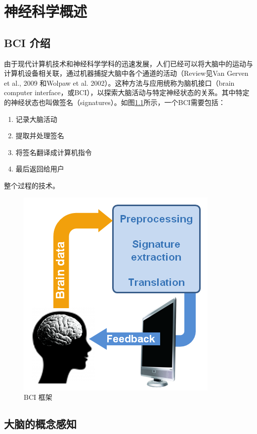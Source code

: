 \chapter{神经科学概述}

\section{BCI 介绍}

由于现代计算机技术和神经科学学科的迅速发展，人们已经可以将大脑中的运动与计算机设备相关联，通过机器捕捉大脑中各个通道的活动（Review见Van Gerven et al., 2009 和Wolpaw et al. 2002）。这种方法与应用统称为脑机接口（brain computer interface，或BCI），以探索大脑活动与特定神经状态的关系。其中特定的神经状态也叫做签名（signatures）。如图\ref{Fig:bci_brief}所示，一个BCI需要包括：
\begin{enumerate}
\item{记录大脑活动}
\item{提取并处理签名}
\item{将签名翻译成计算机指令}
\item{最后返回给用户}
\end{enumerate}

整个过程的技术。

\begin{figure}[htb]
\centering
\includegraphics[scale=0.8]{Pictures/Chap1/bci_cycle_v2-2.png}
\caption{BCI 框架}
\label{Fig:bci_brief}
\end{figure}





\section{大脑的概念感知}


